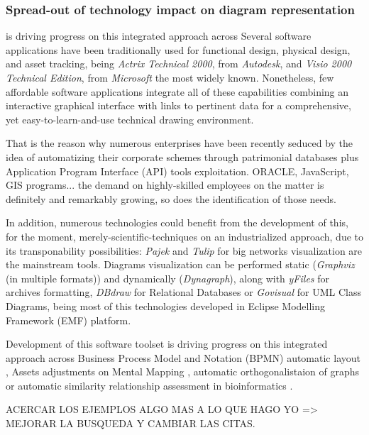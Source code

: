 \subsubsection{Spread-out of technology impact on diagram representation}


is driving progress on this  integrated approach across
Several software applications have been traditionally used for functional design, physical design, and asset tracking, being \textit{Actrix Technical 2000}, from \textit{Autodesk}, and \textit{Visio 2000 Technical Edition}, from \textit{Microsoft} the most widely known. Nonetheless, few affordable software applications integrate all of these capabilities combining an interactive graphical interface with links to pertinent data for a comprehensive, yet easy-to-learn-and-use technical drawing environment.

That is the reason why numerous enterprises have been recently seduced by the idea of automatizing their corporate schemes through patrimonial databases plus Application Program Interface (API) tools exploitation. ORACLE,  JavaScript\cite{automatic-orthogonal-graph,CIMjava}, GIS programs... the demand on highly-skilled employees on the matter is definitely and remarkably growing, so does the identification of those needs. 

In addition, numerous technologies could benefit from the development of this, for the moment, merely-scientific-techniques on an industrialized approach, due to its transponability possibilities: \textit{Pajek} and \textit{Tulip} for big networks visualization \cite{aig-state-of-art-softwares} are the mainstream tools. Diagrams visualization can be performed static (\textit{Graphviz} (in multiple formats)) and dynamically (\textit{Dynagraph}), along with \textit{yFiles} for archives formatting, \textit{DBdraw} for Relational Databases or \textit{Govisual} for UML Class Diagrams, being most of this technologies developed in Eclipse Modelling Framework (EMF) platform.

Development of this software toolset is driving progress on this integrated approach across Business Process Model and Notation (BPMN) automatic layout \cite{automatic-layout-bpmn}, Assets adjustments on Mental Mapping \cite{layout-adjustement-mental-map}, automatic orthogonalistaion of graphs \cite{automatic-orthogonal-graph} or automatic similarity relationship assessment in bioinformatics \cite{algorithm-biological-data}.

ACERCAR LOS EJEMPLOS ALGO MAS A LO QUE HAGO YO => MEJORAR LA BUSQUEDA Y CAMBIAR LAS CITAS.

